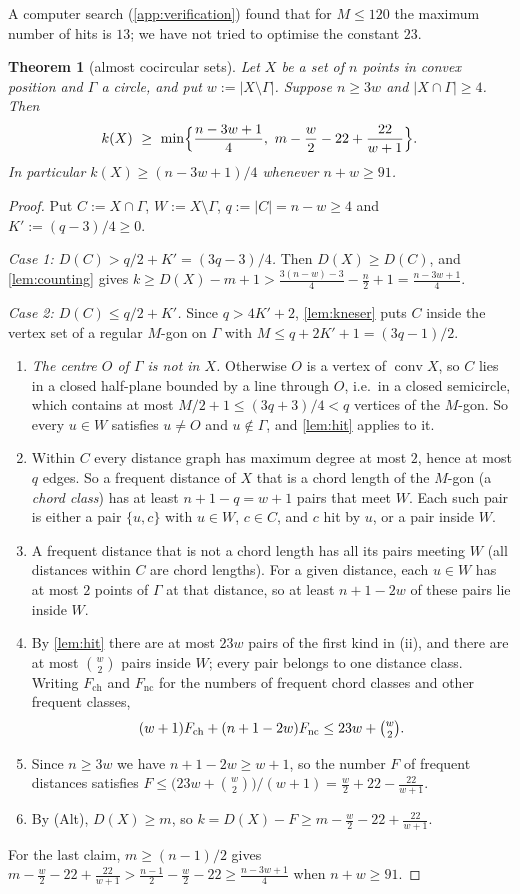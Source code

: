 \documentclass[11pt]{amsart}
\newtheorem{theorem}{Theorem}[section]
\theoremstyle{definition}
\theoremstyle{remark}
\newcommand{\conv}{\operatorname{conv}}
\begin{document}
A computer search (\cref{app:verification}) found that for $M\le120$ the maximum number of hits is $13$; we have not tried to optimise the constant $23$.

\begin{theorem}[almost cocircular sets]\label{thm:AC}
Let $X$ be a set of $n$ points in convex position and $\Gamma$ a circle, and put $w:=|X\setminus\Gamma|$. Suppose $n\ge3w$ and $|X\cap\Gamma|\ge4$. Then
\[
k(X)\ \ge\ \min\Bigl\{\frac{n-3w+1}{4},\ m-\frac w2-22+\frac{22}{w+1}\Bigr\}.
\]
In particular $k(X)\ge(n-3w+1)/4$ whenever $n+w\ge91$.
\end{theorem}
\begin{proof}
Put $C:=X\cap\Gamma$, $W:=X\setminus\Gamma$, $q:=|C|=n-w\ge4$ and $K':=(q-3)/4\ge0$.

\emph{Case 1: $D(C)>q/2+K'=(3q-3)/4$.} Then $D(X)\ge D(C)$, and \cref{lem:counting} gives $k\ge D(X)-m+1>\frac{3(n-w)-3}4-\frac n2+1=\frac{n-3w+1}4$.

\emph{Case 2: $D(C)\le q/2+K'$.} Since $q>4K'+2$, \cref{lem:kneser} puts $C$ inside the vertex set of a regular $M$-gon on $\Gamma$ with $M\le q+2K'+1=(3q-1)/2$.
\begin{enumerate}[leftmargin=2em,label=(\roman*)]
\item \emph{The centre $O$ of $\Gamma$ is not in $X$.} Otherwise $O$ is a vertex of $\conv X$, so $C$ lies in a closed half-plane bounded by a line through $O$, i.e.\ in a closed semicircle, which contains at most $M/2+1\le(3q+3)/4<q$ vertices of the $M$-gon. So every $u\in W$ satisfies $u\ne O$ and $u\notin\Gamma$, and \cref{lem:hit} applies to it.
\item Within $C$ every distance graph has maximum degree at most $2$, hence at most $q$ edges. So a frequent distance of $X$ that is a chord length of the $M$-gon (a \emph{chord class}) has at least $n+1-q=w+1$ pairs that meet $W$. Each such pair is either a pair $\{u,c\}$ with $u\in W$, $c\in C$, and $c$ hit by $u$, or a pair inside $W$.
\item A frequent distance that is not a chord length has all its pairs meeting $W$ (all distances within $C$ are chord lengths). For a given distance, each $u\in W$ has at most $2$ points of $\Gamma$ at that distance, so at least $n+1-2w$ of these pairs lie inside $W$.
\item By \cref{lem:hit} there are at most $23w$ pairs of the first kind in (ii), and there are at most $\binom w2$ pairs inside $W$; every pair belongs to one distance class. Writing $F_{\mathrm{ch}}$ and $F_{\mathrm{nc}}$ for the numbers of frequent chord classes and other frequent classes,
\[
(w+1)F_{\mathrm{ch}}+(n+1-2w)F_{\mathrm{nc}}\le 23w+\tbinom w2 .
\]
\item Since $n\ge3w$ we have $n+1-2w\ge w+1$, so the number $F$ of frequent distances satisfies $F\le\bigl(23w+\binom w2\bigr)/(w+1)=\frac w2+22-\frac{22}{w+1}$.
\item By (Alt), $D(X)\ge m$, so $k=D(X)-F\ge m-\frac w2-22+\frac{22}{w+1}$.
\end{enumerate}
For the last claim, $m\ge(n-1)/2$ gives $m-\frac w2-22+\frac{22}{w+1}>\frac{n-1}2-\frac w2-22\ge\frac{n-3w+1}4$ when $n+w\ge91$.
\end{proof}
\end{document}
